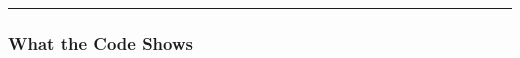 \documentclass{article}
\begin{document}








\medskip\hrule\medskip

\subsubsection{What the Code Shows}
\end{document}
